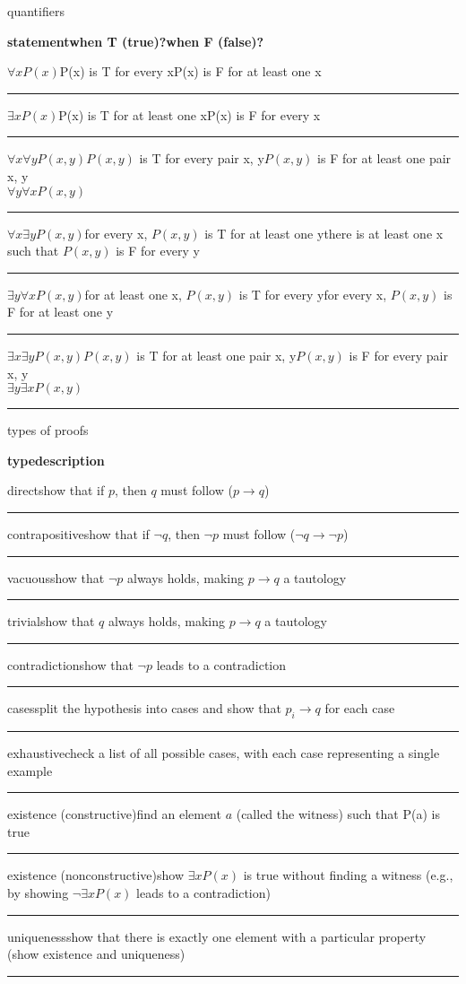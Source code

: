 \documentclass{article}
\newcommand{\quantifierStatement}[4]{
    \noindent\parbox{\linewidth}{
        #1\hfill#3\hfill#4\\
        #2
        \par
        \vspace{.5\baselineskip}
        \hrule
        \vspace{.5\baselineskip}
    }
}
\newcommand{\twoPartStatement}[2]{
    \noindent\parbox{\linewidth}{
        #1\hfill#2
        \par
        \vspace{.5\baselineskip}
        \hrule
        \vspace{.5\baselineskip}
    }
}
\newcommand{\twoFields}[2]{
    \noindent
    \textbf{#1}\hfill\textbf{#2} \\
    \par
}
\newcommand{\threeFields}[3]{
    \noindent
    \textbf{#1}\hfill\textbf{#2}\hfill\textbf{#3}\\
    \par
}
\newcommand{\sectionTitle}[1]{
    \begin{center}
        \large #1
    \end{center}
}
\begin{document}
\sectionTitle{quantifiers}
\threeFields{statement}{when T (true)?}{when F (false)?}
\quantifierStatement
    {$\forall xP(x)$}
    {}
    {P(x) is T for every x}
    {P(x) is F for at least one x}
\quantifierStatement
    {$\exists xP(x)$}
    {}
    {P(x) is T for at least one x}
    {P(x) is F for every x}
\quantifierStatement
    {$\forall x\forall yP(x,y)$}
    {$\forall y\forall xP(x,y)$}
    {$P(x,y)$ is T for every pair x, y}
    {$P(x,y)$ is F for at least one pair x, y}
\quantifierStatement
    {$\forall x\exists yP(x,y)$}
    {}
    {for every x, $P(x,y)$ is T for at least one y}
    {there is at least one x such that $P(x,y)$ is F for every y}
\quantifierStatement
    {$\exists y\forall xP(x,y)$}
    {}
    {for at least one x, $P(x,y)$ is T for every y}
    {for every x, $P(x,y)$ is F for at least one y}
\quantifierStatement
    {$\exists x\exists yP(x,y)$}
    {$\exists y\exists xP(x,y)$}
    {$P(x,y)$ is T for at least one pair x, y}
    {$P(x,y)$ is F for every pair x, y}
\vspace{-\baselineskip}

\sectionTitle{types of proofs}
\twoFields{type}{description}
\twoPartStatement
    {direct}
    {show that if $p$, then $q$ must follow ($p\rightarrow q$)}
\twoPartStatement
    {contrapositive}
    {show that if $\neg q$, then $\neg p$ must follow ($\neg q\rightarrow\neg p$)}
\twoPartStatement
    {vacuous}
    {show that $\neg p$ always holds, making $p\rightarrow q$ a tautology}
\twoPartStatement
    {trivial}
    {show that $q$ always holds, making $p\rightarrow q$ a tautology}
\twoPartStatement
    {contradiction}
    {show that $\neg p$ leads to a contradiction}
\twoPartStatement
    {cases}
    {split the hypothesis into cases and show that $p_i\rightarrow q$ for each case}
\twoPartStatement
    {exhaustive}
    {check a list of all possible cases, with each case representing a single example}
\twoPartStatement
    {existence (constructive)}
    {find an element $a$ (called the witness) such that P(a) is true}
\twoPartStatement
    {existence (nonconstructive)}
    {show $\exists xP(x)$ is true without finding a witness (e.g., by showing $\neg\exists xP(x)$ leads to a contradiction)}
\twoPartStatement
    {uniqueness}
    {show that there is exactly one element with a particular property (show existence and uniqueness)}
\vspace{-\baselineskip}
\end{document}
